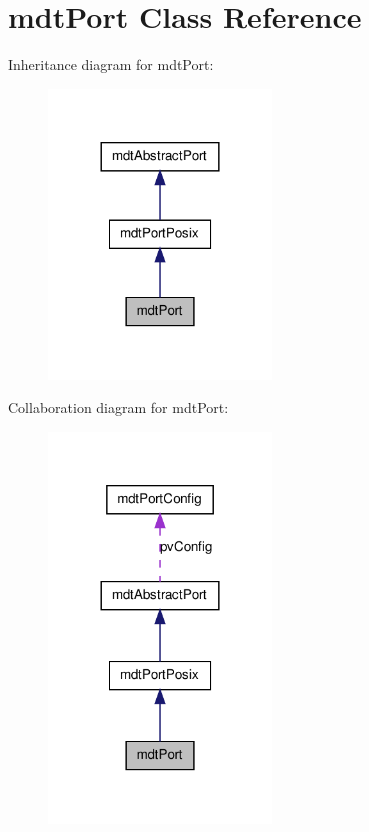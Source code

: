 \hypertarget{classmdt_port}{
\section{mdtPort Class Reference}
\label{classmdt_port}
}


Inheritance diagram for mdtPort:\nopagebreak
\begin{figure}[H]
\begin{center}
\leavevmode
\includegraphics[width=168pt]{classmdt_port__inherit__graph}
\end{center}
\end{figure}


Collaboration diagram for mdtPort:\nopagebreak
\begin{figure}[H]
\begin{center}
\leavevmode
\includegraphics[width=168pt]{classmdt_port__coll__graph}
\end{center}
\end{figure}
